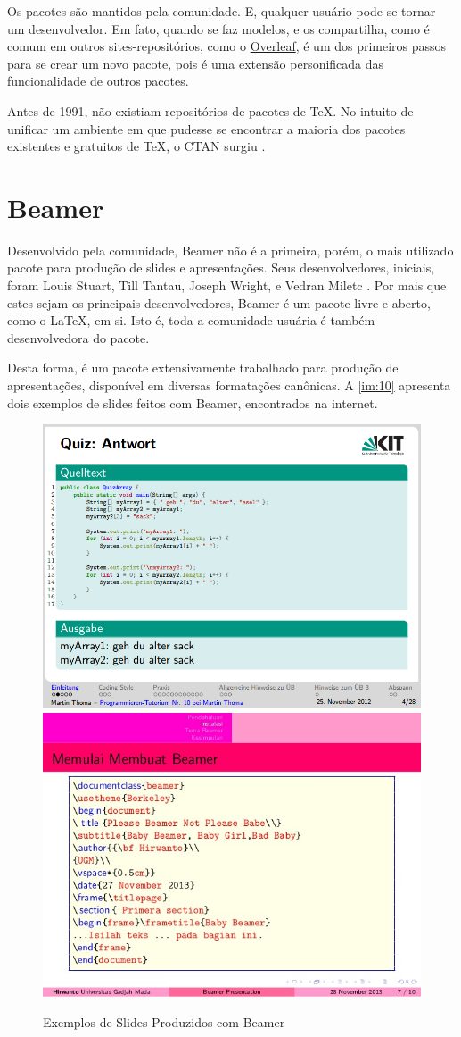 \documentclass[
12pt,				%
openright,			%
oneside,			%
a4paper,			%
english,			%
french,				%
spanish,			%
brazil,				%
]{abntex2}
\begin{document}
Os pacotes são mantidos pela comunidade. E, qualquer usuário pode se
tornar um desenvolvedor. Em fato, quando se faz modelos, e os
compartilha, como é comum em outros sites-repositórios, como o
\href{https://www.overleaf.com/}{Overleaf}, é um dos primeiros passos
para se crear um novo pacote, pois é uma extensão personificada das
funcionalidade de outros pacotes.

Antes de 1991, não existiam repositórios de pacotes de \TeX{}. No
intuito de unificar um ambiente em que pudesse se encontrar a maioria
dos pacotes existentes e gratuitos de \TeX{}, o CTAN surgiu
\cite{greenwade1993comprehensive}.

\section{Beamer}

Desenvolvido pela comunidade, Beamer não é a primeira, porém, o mais
utilizado pacote para produção de slides e apresentações. Seus
desenvolvedores, iniciais, foram Louis Stuart, Till Tantau, Joseph
Wright, e Vedran Miletc \cite{tantau2010}. Por mais que estes sejam os principais
desenvolvedores, Beamer é um pacote livre e aberto, como o \LaTeX, em
si. Isto é, toda a comunidade usuária é também desenvolvedora do
pacote.


Desta forma, é um pacote extensivamente trabalhado para
produção de apresentações, disponível em diversas formatações
canônicas. A \autoref{im:10} apresenta dois exemplos de slides feitos
com Beamer, encontrados na internet.

\begin{figure}[!htb]
  \caption{\label{im:10} Exemplos de Slides Produzidos com Beamer}
  \begin{center}
    \includegraphics[width=0.45\linewidth]{./Imagens/beamer.png}
    \includegraphics[width=0.45\linewidth]{./Imagens/beamer2.jpg}
  \end{center}
\end{figure}
\end{document}
